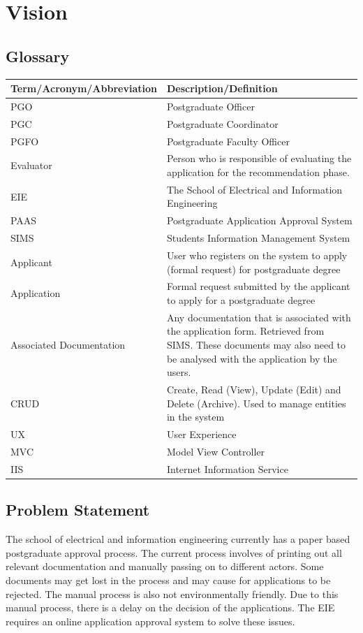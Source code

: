 \documentclass{article}
\begin{document}
\section{Vision}
\subsection{Glossary}
\begin{tabu} to \textwidth {| X[l] | X[l] |}
\hline
\textbf{Term/Acronym/Abbreviation} & \textbf{Description/Definition} \\
\hline
PGO & Postgraduate Officer \\
\hline
PGC & Postgraduate Coordinator \\
\hline
PGFO & Postgraduate Faculty Officer \\
\hline
Evaluator & Person who is responsible of evaluating the application for the recommendation phase. \\
\hline
EIE & The School of Electrical and Information Engineering \\
\hline
PAAS & Postgraduate Application Approval System \\
\hline
SIMS & Students Information Management System \\
\hline
Applicant & User who registers on the system to apply (formal request) for postgraduate degree \\
\hline
Application & Formal request submitted by the applicant to apply for a postgraduate degree \\
\hline
Associated Documentation & Any documentation that is associated with the application form. Retrieved from SIMS. These documents may also need to be analysed with the application by the users. \\
\hline
CRUD & Create, Read (View), Update (Edit) and Delete (Archive). Used to manage entities in the system \\
\hline
UX & User Experience \\
\hline
MVC & Model View Controller \\
\hline
IIS & Internet Information Service \\
\hline
\end{tabu}
\subsection{Problem Statement}
The school of electrical and information engineering currently has a paper based postgraduate approval process. The current process involves of printing out all relevant documentation and manually passing on to different actors. Some documents may get lost in the process and may cause for applications to be rejected. The manual process is also not environmentally friendly. Due to this manual process, there is a delay on the decision of the applications. The EIE requires an online application approval system to solve these issues.
\end{document}
